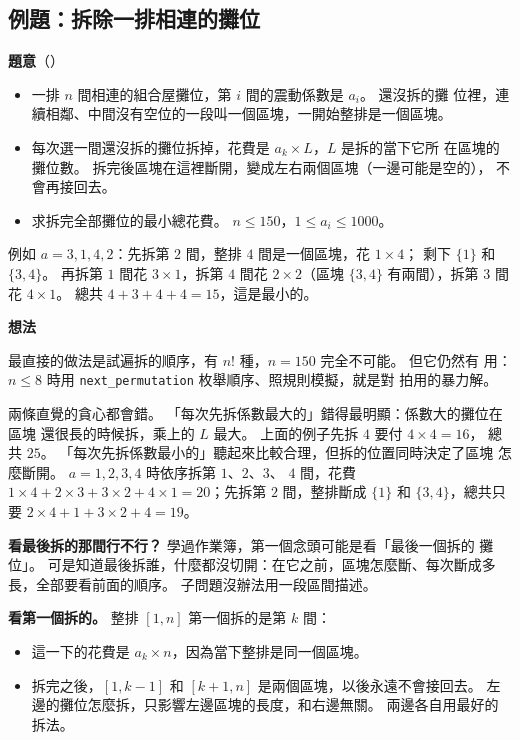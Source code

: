 \subsection{例題：拆除一排相連的攤位}
\label{sec:ex-ivdp-demolish}

\textbf{題意}（）

\begin{itemize}
\item 一排 $n$ 間相連的組合屋攤位，第 $i$ 間的震動係數是 $a_i$。 還沒拆的攤
位裡，連續相鄰、中間沒有空位的一段叫一個區塊，一開始整排是一個區塊。
\item 每次選一間還沒拆的攤位拆掉，花費是 $a_k \times L$，$L$ 是拆的當下它所
在區塊的攤位數。 拆完後區塊在這裡斷開，變成左右兩個區塊（一邊可能是空的），
不會再接回去。
\item 求拆完全部攤位的最小總花費。 $n \le 150$，$1 \le a_i \le 1000$。
\end{itemize}

例如 $a = 3, 1, 4, 2$：先拆第 $2$ 間，整排 $4$ 間是一個區塊，花 $1 \times 4$；
剩下 $\{1\}$ 和 $\{3, 4\}$。 再拆第 $1$ 間花 $3 \times 1$，拆第 $4$ 間花
$2 \times 2$（區塊 $\{3, 4\}$ 有兩間），拆第 $3$ 間花 $4 \times 1$。 總共
$4 + 3 + 4 + 4 = 15$，這是最小的。

\textbf{想法}

最直接的做法是試遍拆的順序，有 $n!$ 種，$n = 150$ 完全不可能。 但它仍然有
用：$n \le 8$ 時用 \texttt{next\_permutation} 枚舉順序、照規則模擬，就是對
拍用的暴力解。

兩條直覺的貪心都會錯。 「每次先拆係數最大的」錯得最明顯：係數大的攤位在區塊
還很長的時候拆，乘上的 $L$ 最大。 上面的例子先拆 $4$ 要付 $4 \times 4 = 16$，
總共 $25$。 「每次先拆係數最小的」聽起來比較合理，但拆的位置同時決定了區塊
怎麼斷開。 $a = 1, 2, 3, 4$ 時依序拆第 $1$、$2$、$3$、
$4$ 間，花費 $1 \times 4 + 2 \times 3 + 3 \times 2 + 4 \times 1 = 20$；先拆第
$2$ 間，整排斷成 $\{1\}$ 和 $\{3, 4\}$，總共只要
$2 \times 4 + 1 + 3 \times 2 + 4 = 19$。

\textbf{看最後拆的那間行不行？} 學過作業簿，第一個念頭可能是看「最後一個拆的
攤位」。 可是知道最後拆誰，什麼都沒切開：在它之前，區塊怎麼斷、每次斷成多
長，全部要看前面的順序。 子問題沒辦法用一段區間描述。

\textbf{看第一個拆的。} 整排 $[1, n]$ 第一個拆的是第 $k$ 間：

\begin{itemize}
\item 這一下的花費是 $a_k \times n$，因為當下整排是同一個區塊。
\item 拆完之後，$[1, k - 1]$ 和 $[k + 1, n]$ 是兩個區塊，以後永遠不會接回去。
左邊的攤位怎麼拆，只影響左邊區塊的長度，和右邊無關。 兩邊各自用最好的拆法。
\end{itemize}

